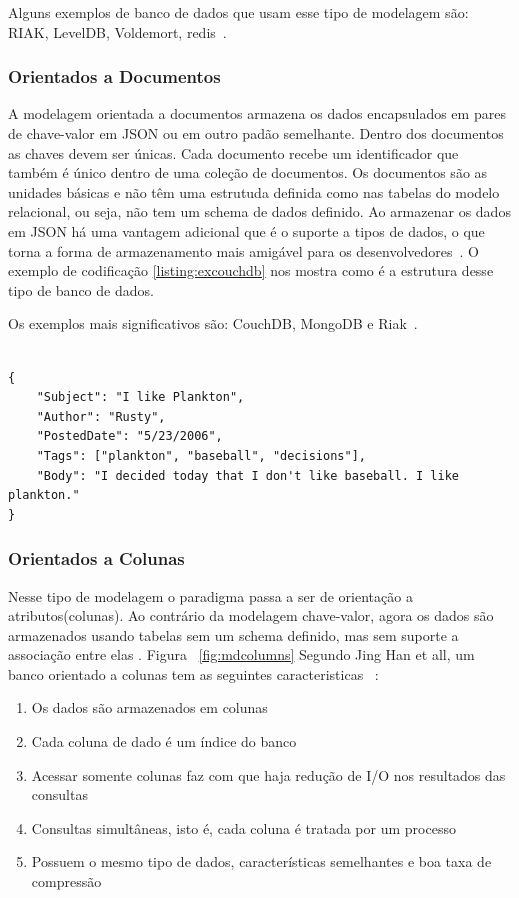Alguns exemplos de banco de dados que usam esse tipo de modelagem são: RIAK, LevelDB, Voldemort, redis~\cite{nosqldatabaseorg}.

\subsubsection{Orientados a Documentos}

A modelagem orientada a documentos armazena os dados encapsulados em pares de chave-valor em JSON ou em outro padão semelhante. Dentro dos documentos as chaves devem ser únicas. Cada documento recebe um identificador que também é único dentro de uma coleção de documentos. Os documentos são as unidades básicas e não têm uma estrutuda definida como nas tabelas do modelo relacional, ou seja, não tem um schema de dados definido. Ao armazenar os dados em JSON há uma vantagem adicional que é o suporte a tipos de dados, o que torna a forma de armazenamento mais amigável para os desenvolvedores~\cite{nosqlevaluation,nosqlxrelacional}. O exemplo de codificação \ref{listing:excouchdb} nos mostra como é a estrutura desse tipo de banco de dados.

Os exemplos mais significativos são: CouchDB, MongoDB e Riak~\cite{nosqlevaluation}.

	\begin{lstlisting}[caption=Exemplo de arquivo do CouchDB, frame=trBL,breaklines=true,label=listing:excouchdb]

{
    "Subject": "I like Plankton",
    "Author": "Rusty",
    "PostedDate": "5/23/2006",
    "Tags": ["plankton", "baseball", "decisions"],
    "Body": "I decided today that I don't like baseball. I like plankton."
}
	\end{lstlisting}

\subsubsection{Orientados a Colunas}

Nesse tipo de modelagem o paradigma passa a ser de orientação a atributos(colunas). Ao contrário da modelagem chave-valor, agora os dados são armazenados usando tabelas sem um schema definido, mas sem suporte a associação entre elas . Figura ~\ref{fig:mdcolumns} Segundo Jing Han et all, um banco orientado a colunas tem as seguintes caracteristicas ~\cite{surveynosql}:


\begin{enumerate}
\item{Os dados são armazenados em colunas}
\item{Cada coluna de dado é um índice do banco}
\item{Acessar somente colunas faz com que haja redução de I/O nos resultados das consultas}
\item{Consultas simultâneas, isto é, cada coluna é tratada por um processo}
\item{Possuem o mesmo tipo de dados, características semelhantes e boa taxa de compressão}
\end{enumerate}

